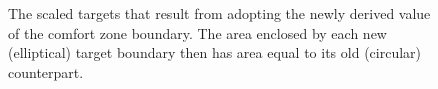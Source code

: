 \begin{figure}
	\centering
\vspace*{-1.2cm}
	\hspace{1cm}		
	\caption{The scaled targets that result from adopting the newly derived value of the comfort zone boundary. The area enclosed by each new (elliptical) target boundary then has area equal to its old (circular) counterpart.}
	\label{fig:expThreeSpace}
\end{figure}





